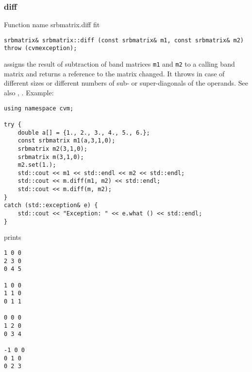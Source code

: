 \subsubsection{diff}
Function%
\pdfdest name {srbmatrix.diff} fit
\begin{verbatim}
srbmatrix& srbmatrix::diff (const srbmatrix& m1, const srbmatrix& m2)
throw (cvmexception);
\end{verbatim}
assigns the result of subtraction of
band matrices \verb"m1" and \verb"m2" to a calling band matrix
and returns a reference to
the matrix changed.
It throws  
in case of different sizes or different numbers of sub- or super-diagonals
of the operands.
See also ,
.
Example:
\begin{Verbatim}
using namespace cvm;

try {
    double a[] = {1., 2., 3., 4., 5., 6.};
    const srbmatrix m1(a,3,1,0);
    srbmatrix m2(3,1,0);
    srbmatrix m(3,1,0);
    m2.set(1.);
    std::cout << m1 << std::endl << m2 << std::endl;
    std::cout << m.diff(m1, m2) << std::endl;
    std::cout << m.diff(m, m2);
}
catch (std::exception& e) {
    std::cout << "Exception: " << e.what () << std::endl;
}
\end{Verbatim}
prints
\begin{Verbatim}
1 0 0
2 3 0
0 4 5

1 0 0
1 1 0
0 1 1

0 0 0
1 2 0
0 3 4

-1 0 0
0 1 0
0 2 3
\end{Verbatim}
\newpage





